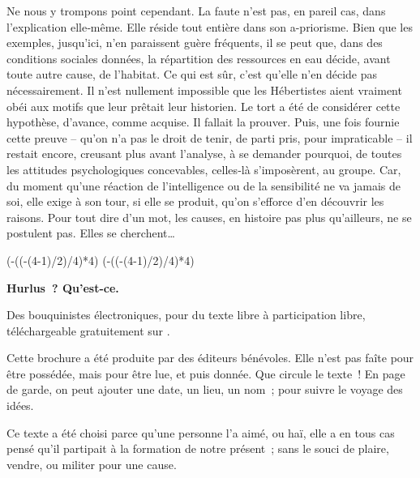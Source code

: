 \documentclass[french,twoside]{book} %
\newcommand{\astermono}{\medskip\centerline{\color{rubric}\large\selectfont{\syms ✻}}\medskip\par}%
\def\truncdiv#1#2{((#1-(#2-1)/2)/#2)}
\def\moduloop#1#2{(#1-\truncdiv{#1}{#2}*#2)}
\def\modulo#1#2{\number\numexpr\moduloop{#1}{#2}\relax}
\begin{document}
\astermono

\noindent Ne nous y trompons point cependant. La faute n’est pas, en pareil cas, dans l’explication elle‑même. Elle réside tout entière dans son a-prio­risme. Bien que les exemples, jusqu’ici, n’en paraissent guère fréquents, il se peut que, dans des conditions sociales données, la répartition des ressources en eau décide, avant toute autre cause, de l’habitat. Ce qui est sûr, c’est qu’elle n’en décide pas nécessairement. Il n’est nullement impossible que les Hébertistes aient vraiment obéi aux motifs que leur prêtait leur historien. Le tort a été de considérer cette hypothèse, d’avance, comme acquise. Il fallait la prouver. Puis, une fois fournie cette preuve – qu’on n’a pas le droit de tenir, de parti pris, pour impraticable – il restait encore, creusant plus avant l’analyse, à se demander pourquoi, de toutes les attitudes psychologiques concevables, celles‑là s’imposèrent, au groupe. Car, du moment qu’une réaction de l’intelligence ou de la sensibilité ne va jamais de soi, elle exige à son tour, si elle se produit, qu’on s’efforce d’en découvrir les raisons. Pour tout dire d’un mot, les causes, en histoire pas plus qu’ailleurs, ne se postulent pas. Elles se cher­chent…
 


\ifbooklet
  \pagestyle{empty}
  \clearpage
  \ifnum\modulo{\value{page}}{4}=0 \hbox{}\newpage\hbox{}\newpage\fi
  \ifnum\modulo{\value{page}}{4}=1 \hbox{}\newpage\hbox{}\newpage\fi


  \hbox{}\newpage
  \ifodd\value{page}\hbox{}\newpage\fi
  {\centering\color{rubric}\bfseries\noindent\large
    Hurlus ? Qu’est-ce.\par
    \bigskip
  }
  \noindent Des bouquinistes électroniques, pour du texte libre à participation libre,
  téléchargeable gratuitement sur \href{https://hurlus.fr}{}.\par
  \bigskip
  \noindent Cette brochure a été produite par des éditeurs bénévoles.
  Elle n’est pas faîte pour être possédée, mais pour être lue, et puis donnée.
  Que circule le texte !
  En page de garde, on peut ajouter une date, un lieu, un nom ; pour suivre le voyage des idées.
  \par

  Ce texte a été choisi parce qu’une personne l’a aimé,
  ou haï, elle a en tous cas pensé qu’il partipait à la formation de notre présent ;
  sans le souci de plaire, vendre, ou militer pour une cause.
  \par
\end{document}
